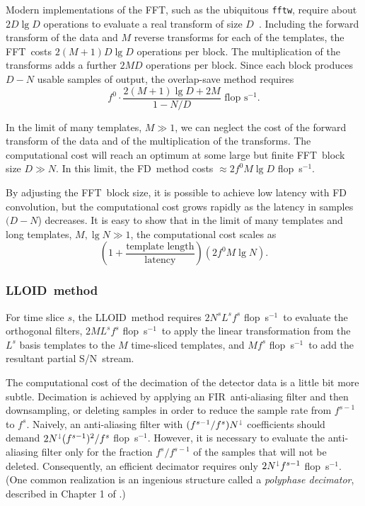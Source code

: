 \documentclass[preprint2]{aastex}
\newcommand{\SNR}{S/N}%
\newcommand{\tmpsamps}{\ensuremath{N}}
\newcommand{\numtmps}{\ensuremath{M}}
\newcommand{\svdtmps}[1]{\ensuremath{L^#1}}
\newcommand{\numsvdtmps}{\svdtmps{s}}
\newcommand{\slicesamps}[1]{\ensuremath{N^#1}}
\newcommand{\slicessamps}{\slicesamps{s}}
\newcommand{\fftblock}{\ensuremath{D}}
\newcommand{\fir}{FIR}%
\newcommand{\fft}{FFT}%
\newcommand{\flops}{flop~s$^{-1}$}
\newcommand{\lloid}{LLOID}%
\newcommand{\FD}{FD}%
\begin{document}
Modern implementations of the \fft, such as the ubiquitous \texttt{fftw}, require about
$2 \fftblock \lg \fftblock$ operations to evaluate a real transform of size
$\fftblock$~\citep{Johnson:2007p9654}.  Including the forward transform of the data and
$M$ reverse transforms for each of the templates, the \fft\ costs $2 (\numtmps + 1)
\fftblock \lg \fftblock$ operations per block.  The multiplication of the transforms adds
a further $2 \numtmps \fftblock$ operations per block.  Since each block produces
$\fftblock - \tmpsamps$ usable samples of output, the overlap-save method requires
%
\begin{equation}
	\label{eq:fd-flops}
	f^0 \cdot \frac{2 (\numtmps + 1) \lg \fftblock + 2 \numtmps}{1 - \tmpsamps/\fftblock} \textrm{ \flops}.
\end{equation}

In the limit of many templates, $M \gg 1$, we can neglect the cost of the forward
transform of the data and of the multiplication of the transforms.  The computational
cost will reach an optimum at some large but finite \fft\ block size
$\fftblock \gg \tmpsamps$.  In this limit, the \FD\ method costs
$\approx 2 f^0 \numtmps \lg \fftblock$ \flops.

By adjusting the \fft\ block size, it is possible to achieve low latency with FD
convolution, but the computational cost grows rapidly as the latency in samples
$(D-N$) decreases.  It is easy to show that in the limit of many templates and
long templates, $M, \lg N \gg 1$, the computational cost scales as
%
$$
\left(1 + \frac{\textrm{template length}}{\textrm{latency}}\right) \left( 2 f^0 M \lg N \right).
$$

\subsubsection{\label{sec:lloid-method}\lloid\ method}

For time slice $s$, the \lloid\ method requires $2 \slicessamps \numsvdtmps f^s$ \flops\ 
to evaluate the orthogonal filters, $2 \numtmps \numsvdtmps f^s$ \flops\ to
apply the  linear transformation from the $\numsvdtmps$ basis templates to the
$\numtmps$ time-sliced templates, and $\numtmps f^s$ \flops\ to add the
resultant partial \SNR\ stream.

The computational cost of the decimation of the detector data is a little bit
more subtle.  Decimation is achieved by applying an \fir\ anti-aliasing filter
and then downsampling, or deleting samples in order to reduce the sample rate
from $f^{s-1}$ to $f^s$.  Naively, an anti-aliasing filter with
$(f^{s-1} / f^s) N^\shortdownarrow$ coefficients should demand
$2 N^\shortdownarrow (f^{s-1})^2 / f^s$ \flops.  However, it is necessary to
evaluate the anti-aliasing filter only for the fraction $f^s / f^{s-1}$ of the
samples that will not be deleted.  Consequently, an efficient decimator 
requires only $2 N^\shortdownarrow f^{s-1}$ \flops.  (One common realization is an ingenious structure called a \emph{polyphase decimator}, described in Chapter 1 of \citet{jovanovic2002multirate}.)
\end{document}
